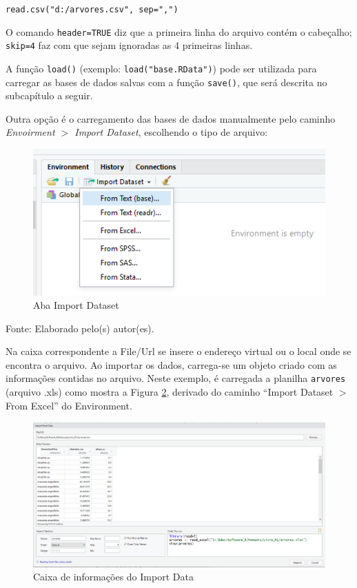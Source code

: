\documentclass[12pt,brazil,oneside]{book}
\begin{document}
\texttt{read.csv("d:/arvores.csv",\ sep=",")}

O comando \texttt{header=TRUE} diz que a primeira linha do arquivo contém o cabeçalho; \texttt{skip=4} faz com que sejam ignoradas as 4 primeiras linhas.

A função \texttt{load()} (exemplo: \texttt{load("base.RData")}) pode ser utilizada para carregar as bases de dados salvas com a função \texttt{save()}, que será descrita no subcapítulo a seguir.

Outra opção é o carregamento das bases de dados manualmente pelo caminho \emph{Envoirment \(>\) Import Dataset}, escolhendo o tipo de arquivo:

\begin{figure}[H]

{\centering \includegraphics[width=0.7\linewidth]{r3} 

}

\caption{Aba Import Dataset}\label{fig:r3}
\end{figure}

Fonte: Elaborado pelo(s) autor(es).

Na caixa correspondente a File/Url se insere o endereço virtual ou o local onde se encontra o arquivo. Ao importar os dados, carrega-se um objeto criado com as informações contidas no arquivo. Neste exemplo, é carregada a planilha \texttt{arvores} (arquivo .xls) como mostra a Figura \ref{fig:r4}, derivado do caminho ``Import Dataset \(>\) From Excel'' do Environment.

\begin{figure}[H]

{\centering \includegraphics[width=0.7\linewidth]{r4} 

}

\caption{Caixa de informações do Import Data}\label{fig:r4}
\end{figure}
\end{document}

